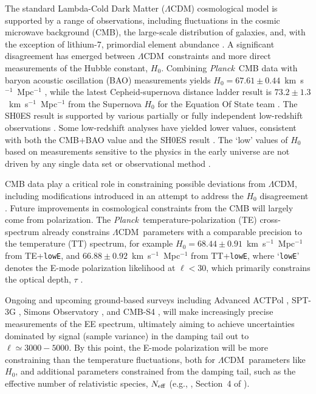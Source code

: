 \documentclass[twocolumn]{aastex63}
\newcommand{\planck}{\textsl{Planck}}
\newcommand{\lcdm}{\ensuremath{\Lambda\mathrm{CDM}}}
\begin{document}
The standard Lambda-Cold Dark Matter (\lcdm) cosmological model is supported by a range of observations, including fluctuations in the cosmic microwave background (CMB), the large-scale distribution of galaxies, and, with the exception of lithium-7, primordial element abundance \citep[e.g.,][]{bennett/etal:2013,planck2016-l06,fields/etal:2020,alam/etal:prep}. A significant disagreement has emerged between \lcdm\ constraints and more direct measurements of the Hubble constant, $H_0$. Combining \planck\ CMB data with baryon acoustic oscillation (BAO) measurements yields $H_0=67.61\pm0.44$~km~s$^{-1}$~Mpc$^{-1}$ \citep{alam/etal:prep}, while the latest Cepheid-supernova distance ladder result is $73.2\pm1.3$~km~s$^{-1}$~Mpc$^{-1}$ from the Supernova $H_0$ for the Equation Of State team \citep[SH0ES;][]{riess/etal:2021}. The SH0ES result is supported by various partially or fully independent low-redshift observations \citep[e.g.,][]{wong/etal:2020,schombert/mcgaugh/lelli:2020,ehsan/etal:2020,soltis/casertano/riess:2021,blakeslee/etal:prep}. Some low-redshift analyses have yielded lower values, consistent with both the CMB+BAO value and the SH0ES result \citep[e.g.,][]{freedman/etal:2019,birrer/etal:2020}. The `low' values of $H_0$ based on measurements sensitive to the physics in the early universe are not driven by any single data set or observational method \citep[e.g.,][]{aubourg/etal:2015,addison/etal:2018}.

CMB data play a critical role in constraining possible deviations from \lcdm, including modifications introduced in an attempt to address the $H_0$ disagreement \citep[e.g.,][and references therein]{knox/millea:2020}. Future improvements in cosmological constraints from the CMB will largely come from polarization. The \planck\ temperature-polarization (TE) cross-spectrum already constrains \lcdm\ parameters with a comparable precision to the temperature (TT) spectrum, for example $H_0=68.44\pm0.91$~km~s$^{-1}$~Mpc$^{-1}$ from TE+\texttt{lowE}, and $66.88\pm0.92$~km~s$^{-1}$~Mpc$^{-1}$ from TT+\texttt{lowE}, where `\texttt{lowE}' denotes the E-mode polarization likelihood at $\ell<30$, which primarily constrains the optical depth, $\tau$ \citep{planck2016-l06}.

Ongoing and upcoming ground-based surveys including Advanced ACTPol \citep{henderson/etal:2016}, SPT-3G \citep{benson/etal:2014}, Simons Observatory \citep{simonsobservatory:2019}, and CMB-S4 \citep{stage4:2019}, will make increasingly precise measurements of the EE spectrum, ultimately aiming to achieve uncertainties dominated by signal (sample variance) in the damping tail out to $\ell\simeq3000-5000$. By this point, the E-mode polarization will be more constraining than the temperature fluctuations, both for \lcdm\ parameters like $H_0$, and additional parameters constrained from the damping tail, such as the effective number of relativistic species, $N_{\rm eff}$ (e.g., \citealt{galli/etal:2014}, Section~4 of \citealt{simonsobservatory:2019}).
\end{document}
